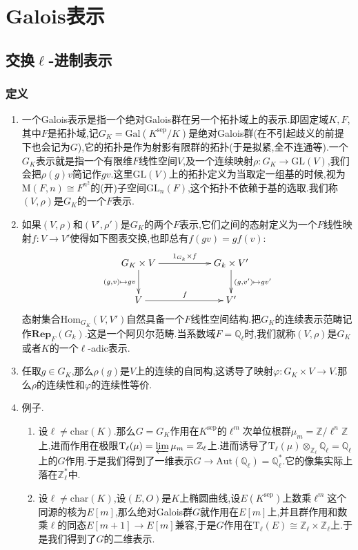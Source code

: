 \chapter{Galois表示}
\section{交换$\ell$-进制表示}
\subsection{定义}
\begin{enumerate}
	\item 一个Galois表示是指一个绝对Galois群在另一个拓扑域上的表示.即固定域$K,F$,其中$F$是拓扑域,记$G_K=\mathrm{Gal}(K^{\mathrm{sep}}/K)$是绝对Galois群(在不引起歧义的前提下也会记为$G$),它的拓扑是作为射影有限群的拓扑(于是拟紧,全不连通等).一个$G_K$表示就是指一个有限维$F$线性空间$V$,及一个连续映射$\rho:G_K\to\mathrm{GL}(V)$,我们会把$\rho(g)v$简记作$gv$.这里$\mathrm{GL}(V)$上的拓扑定义为当取定一组基的时候,视为$\mathrm{M}(F,n)\cong F^{n^2}$的(开)子空间$\mathrm{GL}_n(F)$,这个拓扑不依赖于基的选取.我们称$(V,\rho)$是$G_K$的一个$F$表示.
	\item 如果$(V,\rho)$和$(V',\rho')$是$G_K$的两个$F$表示,它们之间的态射定义为一个$F$线性映射$f:V\to V'$使得如下图表交换,也即总有$f(gv)=gf(v)$:
	$$\xymatrix{G_K\times V\ar[rr]^{1_{G_k}\times f}\ar[d]_{(g,v)\mapsto gv}&&G_k\times V'\ar[d]^{(g,v')\mapsto gv'}\\V\ar[rr]^f&&V'}$$
	态射集合$\mathrm{Hom}_{G_K}(V,V')$自然具备一个$F$线性空间结构.把$G_K$的连续表示范畴记作$\textbf{Rep}_F(G_k)$.这是一个阿贝尔范畴.当系数域$F=\mathbb{Q}_{\ell}$时,我们就称$(V,\rho)$是$G_K$或者$K$的一个$\ell$-adic表示.
	\item 任取$g\in G_K$,那么$\rho(g)$是$V$上的连续的自同构,这诱导了映射$\varphi:G_K\times V\to V$.那么$\rho$的连续性和$\varphi$的连续性等价.
	\item 例子.
	\begin{enumerate}[(1)]
		\item 设$\ell\not=\mathrm{char}(K)$.那么$G=G_K$作用在$K^{\mathrm{sep}}$的$\ell^m$次单位根群$\mu_m=\mathbb{Z}/\ell^n\mathbb{Z}$上,进而作用在极限$\mathrm{T}_{\ell}(\mu)=\varprojlim\mu_m=\mathbb{Z}_{\ell}$上.进而诱导了$\mathrm{T}_{\ell}(\mu)\otimes_{\mathbb{Z}_{\ell}}\mathbb{Q}_{\ell}=\mathbb{Q}_{\ell}$上的$G$作用.于是我们得到了一维表示$G\to\mathrm{Aut}(\mathbb{Q}_{\ell})=\mathbb{Q}_{\ell}^*$.它的像集实际上落在$\mathbb{Z}_{\ell}^*$中.
		\item 设$\ell\not=\mathrm{char}(K)$,设$(E,O)$是$K$上椭圆曲线,设$E(K^{\mathrm{sep}})$上数乘$\ell^m$这个同源的核为$E[m]$,那么绝对Galois群$G$就作用在$E[m]$上,并且群作用和数乘$\ell$的同态$E[m+1]\to E[m]$兼容,于是$G$作用在$\mathrm{T}_{\ell}(E)\cong\mathbb{Z}_{\ell}\times\mathbb{Z}_{\ell}$上.于是我们得到了$G$的二维表示.

\end{enumerate}
\end{enumerate}
